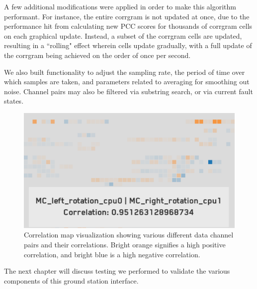 A few additional modifications were applied in order to make this algorithm performant. For instance, the entire corrgram is not updated at once, due to the performance hit from calculating new PCC scores for thousands of corrgram cells on each graphical update. Instead, a subset of the corrgram cells are updated, resulting in a ``rolling" effect wherein cells update gradually, with a full update of the corrgram being achieved on the order of once per second.

We also built functionality to adjust the sampling rate, the period of time over which samples are taken, and parameters related to averaging for smoothing out noise. Channel pairs may also be filtered via substring search, or via current fault states.

\begin{figure}[h]
\centering
    \includegraphics[width=\columnwidth]{images/corr_map.png}
    \caption{Correlation map visualization showing various different data channel pairs and their correlations. Bright orange signifies a high positive correlation, and bright blue is a high negative correlation.}
    \label{fig:corr_map}
\end{figure}

The next chapter will discuss testing we performed to validate the various components of this ground station interface.